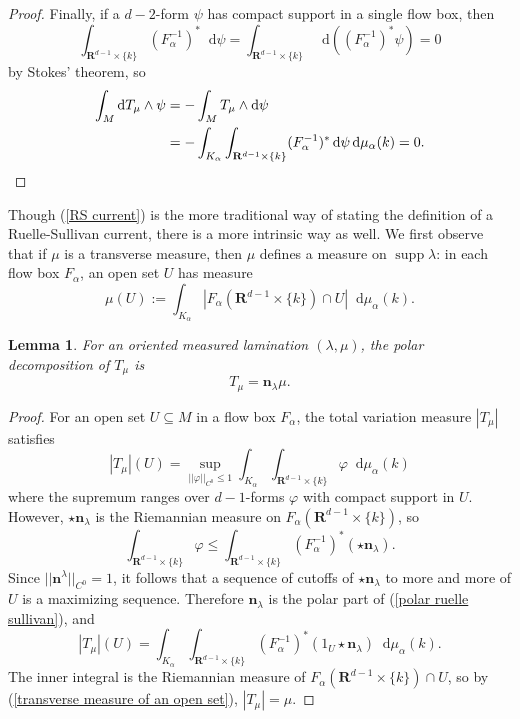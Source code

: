 \documentclass[reqno,11pt]{amsart}
\newcommand{\RR}{\mathbf{R}}
\newcommand*\dif{\mathop{}\!\mathrm{d}}
\DeclareMathOperator{\supp}{supp}
\newcommand{\normal}{\mathbf n}
\newtheorem{lemma}[theorem]{Lemma}
\theoremstyle{definition}
\numberwithin{equation}{section}
\begin{document}
\begin{proof}
Finally, if a $d-2$-form $\psi$ has compact support in a single flow box, then
$$\int_{\RR^{d - 1} \times \{k\}} (F_\alpha^{-1})^* \dif \psi = \int_{\RR^{d - 1} \times \{k\}} \dif((F_\alpha^{-1})^* \psi) = 0$$
by Stokes' theorem, so
\begin{align*}
\int_M \dif T_\mu \wedge \psi &= -\int_M T_\mu \wedge \dif \psi \\
&= -\int_{K_\alpha} \int_{\RR^{d - 1} \times \{k\}} (F_\alpha^{-1})^* \dif \psi \dif \mu_\alpha(k) = 0. \qedhere
\end{align*}
\end{proof}

Though (\ref{RS current}) is the more traditional way of stating the definition of a Ruelle-Sullivan current, there is a more intrinsic way as well.
We first observe that if $\mu$ is a transverse measure, then $\mu$ defines a measure on $\supp \lambda$: in each flow box $F_\alpha$, an open set $U$ has measure
\begin{equation}\label{transverse measure of an open set}
\mu(U) := \int_{K_\alpha} |F_\alpha(\RR^{d - 1} \times \{k\}) \cap U| \dif \mu_\alpha(k).
\end{equation}

\begin{lemma}
For an oriented measured lamination $(\lambda, \mu)$, the polar decomposition of $T_\mu$ is
\begin{equation}\label{polar ruelle sullivan}
T_\mu = \normal_\lambda \mu.
\end{equation}
\end{lemma}
\begin{proof}
For an open set $U \subseteq M$ in a flow box $F_\alpha$, the total variation measure $|T_\mu|$ satisfies
$$|T_\mu|(U) = \sup_{||\varphi||_{C^0} \leq 1} \int_{K_\alpha} \int_{\RR^{d - 1} \times \{k\}} \varphi \dif \mu_\alpha(k)$$
where the supremum ranges over $d-1$-forms $\varphi$ with compact support in $U$.
However, $\star \normal_\lambda$ is the Riemannian measure on $F_\alpha(\RR^{d - 1} \times \{k\})$, so
$$\int_{\RR^{d - 1} \times \{k\}} \varphi \leq \int_{\RR^{d - 1} \times \{k\}} (F_\alpha^{-1})^*(\star \normal_\lambda).$$
Since $||\normal^\lambda||_{C^0} = 1$, it follows that a sequence of cutoffs of $\star \normal_\lambda$ to more and more of $U$ is a maximizing sequence.
Therefore $\normal_\lambda$ is the polar part of (\ref{polar ruelle sullivan}), and
$$|T_\mu|(U) = \int_{K_\alpha} \int_{\RR^{d - 1} \times \{k\}} (F_\alpha^{-1})^*(1_U \star \normal_\lambda) \dif \mu_\alpha(k).$$
The inner integral is the Riemannian measure of $F_\alpha(\RR^{d - 1} \times \{k\}) \cap U$, so by (\ref{transverse measure of an open set}), $|T_\mu| = \mu$.
\end{proof}
\end{document}
